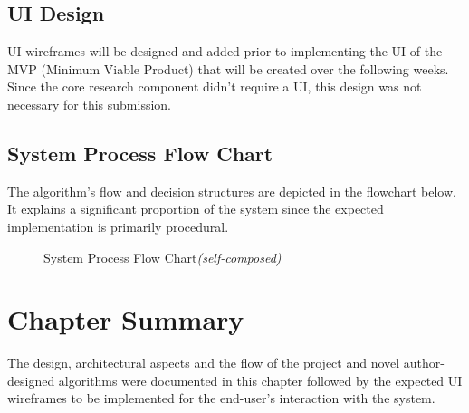 \subsection{UI Design}
UI wireframes will be designed and added prior to implementing the UI of the MVP (Minimum Viable Product) that will be created over the following weeks. Since the core research component didn't require a UI, this design was not necessary for this submission.

\subsection{System Process Flow Chart}
The algorithm's flow and decision structures are depicted in the flowchart below. It explains a significant proportion of the system since the expected implementation is primarily procedural.

\begin{figure}[h!]
\centering
\setlength{\fboxsep}{10pt}%
\setlength{\fboxrule}{0.5pt}%
\caption{System Process Flow Chart\textit{(self-composed)}}
\label{fig:system-process-flowchart}
\end{figure}


\section{Chapter Summary}
The design, architectural aspects and the flow of the project and novel author-designed algorithms were documented in this chapter followed by the expected UI wireframes to be implemented for the end-user's interaction with the system.
